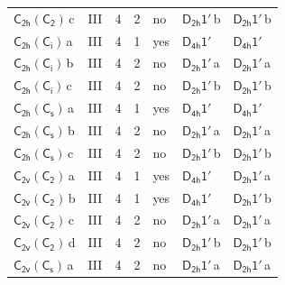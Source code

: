 \documentclass[10pt,a4paper]{article}
\numberwithin{equation}{section}
\newcommand{\grp}[1]{\mathsf{#1}}
\newcommand{\clsletter}[1]{\,{\scriptsize\color{black!55}#1}}
\begin{document}
{\begin{longtable}{@{}llrrlll@{}}
\href{C2h-C2.pdf}{$\grp{C_{2h}}(\grp{C_{2}})$}\clsletter{c} & III & 4 & 2 & no & \href{D2h-1p.pdf}{$\grp{D_{2h}1'}$}\clsletter{b} & \href{D2h-1p.pdf}{$\grp{D_{2h}1'}$}\clsletter{b}\\
\href{C2h-S2.pdf}{$\grp{C_{2h}}(\grp{C_{i}})$}\clsletter{a} & III & 4 & 1 & yes & \href{D4h-1p.pdf}{$\grp{D_{4h}1'}$} & \href{D4h-1p.pdf}{$\grp{D_{4h}1'}$}\\
\href{C2h-S2.pdf}{$\grp{C_{2h}}(\grp{C_{i}})$}\clsletter{b} & III & 4 & 2 & no & \href{D2h-1p.pdf}{$\grp{D_{2h}1'}$}\clsletter{a} & \href{D2h-1p.pdf}{$\grp{D_{2h}1'}$}\clsletter{a}\\
\href{C2h-S2.pdf}{$\grp{C_{2h}}(\grp{C_{i}})$}\clsletter{c} & III & 4 & 2 & no & \href{D2h-1p.pdf}{$\grp{D_{2h}1'}$}\clsletter{b} & \href{D2h-1p.pdf}{$\grp{D_{2h}1'}$}\clsletter{b}\\
\href{C2h-C1v.pdf}{$\grp{C_{2h}}(\grp{C_{s}})$}\clsletter{a} & III & 4 & 1 & yes & \href{D4h-1p.pdf}{$\grp{D_{4h}1'}$} & \href{D4h-1p.pdf}{$\grp{D_{4h}1'}$}\\
\href{C2h-C1v.pdf}{$\grp{C_{2h}}(\grp{C_{s}})$}\clsletter{b} & III & 4 & 2 & no & \href{D2h-1p.pdf}{$\grp{D_{2h}1'}$}\clsletter{a} & \href{D2h-1p.pdf}{$\grp{D_{2h}1'}$}\clsletter{a}\\
\href{C2h-C1v.pdf}{$\grp{C_{2h}}(\grp{C_{s}})$}\clsletter{c} & III & 4 & 2 & no & \href{D2h-1p.pdf}{$\grp{D_{2h}1'}$}\clsletter{b} & \href{D2h-1p.pdf}{$\grp{D_{2h}1'}$}\clsletter{b}\\
\href{C2v-C2.pdf}{$\grp{C_{2v}}(\grp{C_{2}})$}\clsletter{a} & III & 4 & 1 & yes & \href{D4h-1p.pdf}{$\grp{D_{4h}1'}$} & \href{D2h-1p.pdf}{$\grp{D_{2h}1'}$}\clsletter{a}\\
\href{C2v-C2.pdf}{$\grp{C_{2v}}(\grp{C_{2}})$}\clsletter{b} & III & 4 & 1 & yes & \href{D4h-1p.pdf}{$\grp{D_{4h}1'}$} & \href{D2h-1p.pdf}{$\grp{D_{2h}1'}$}\clsletter{b}\\
\href{C2v-C2.pdf}{$\grp{C_{2v}}(\grp{C_{2}})$}\clsletter{c} & III & 4 & 2 & no & \href{D2h-1p.pdf}{$\grp{D_{2h}1'}$}\clsletter{a} & \href{D2h-1p.pdf}{$\grp{D_{2h}1'}$}\clsletter{a}\\
\href{C2v-C2.pdf}{$\grp{C_{2v}}(\grp{C_{2}})$}\clsletter{d} & III & 4 & 2 & no & \href{D2h-1p.pdf}{$\grp{D_{2h}1'}$}\clsletter{b} & \href{D2h-1p.pdf}{$\grp{D_{2h}1'}$}\clsletter{b}\\
\href{C2v-C1v.pdf}{$\grp{C_{2v}}(\grp{C_{s}})$}\clsletter{a} & III & 4 & 2 & no & \href{D2h-1p.pdf}{$\grp{D_{2h}1'}$}\clsletter{a} & \href{D2h-1p.pdf}{$\grp{D_{2h}1'}$}\clsletter{a}\\

\end{longtable}}
\end{document}
